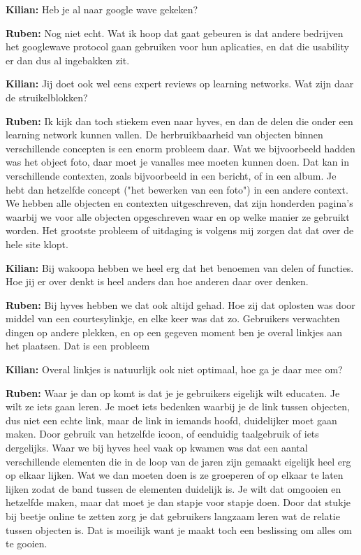 \textbf{Kilian:} Heb je al naar google wave gekeken?

\textbf{Ruben:} Nog niet echt. Wat ik hoop dat gaat gebeuren is dat andere bedrijven het googlewave protocol gaan gebruiken voor hun aplicaties, en dat die usability er dan dus al ingebakken zit.

\textbf{Kilian:} Jij doet ook wel eens expert reviews op learning networks. Wat zijn daar de struikelblokken?

\textbf{Ruben:} Ik kijk dan toch stiekem even naar hyves, en dan de delen die onder een learning network kunnen vallen. De herbruikbaarheid van objecten binnen verschillende concepten is een enorm probleem daar. Wat we bijvoorbeeld hadden was het object foto, daar moet je vanalles mee moeten kunnen doen. Dat kan in verschillende contexten, zoals bijvoorbeeld in een bericht, of in een album. Je hebt dan hetzelfde concept ("het bewerken van een foto") in een andere context. We hebben alle objecten en contexten uitgeschreven, dat zijn honderden pagina's waarbij we voor alle objecten opgeschreven waar en op welke manier ze gebruikt worden. Het grootste probleem of uitdaging is volgens mij zorgen dat dat over de hele site klopt.

\textbf{Kilian:} Bij wakoopa hebben we heel erg dat het benoemen van delen of functies. Hoe jij er over denkt is heel anders dan hoe anderen daar over denken.

\textbf{Ruben:} Bij hyves hebben we dat ook altijd gehad. Hoe zij dat oplosten was door middel van een courtesylinkje, en elke keer was dat zo. Gebruikers verwachten dingen op andere plekken, en op een gegeven moment ben je overal linkjes aan het plaatsen. Dat is een probleem

\textbf{Kilian:} Overal linkjes is natuurlijk ook niet optimaal, hoe ga je daar mee om?

\textbf{Ruben:} Waar je dan op komt is dat je je gebruikers eigelijk wilt educaten. Je wilt ze iets gaan leren. Je moet iets bedenken waarbij je de link tussen objecten, dus niet een echte link, maar de link in iemands hoofd, duidelijker moet gaan maken. Door gebruik van hetzelfde icoon, of eenduidig taalgebruik of iets dergelijks. Waar we bij hyves heel vaak op kwamen was dat een aantal verschillende elementen die in de loop van de jaren zijn gemaakt eigelijk heel erg op elkaar lijken. Wat we dan moeten doen is ze groeperen of op elkaar te laten lijken zodat de band tussen de elementen duidelijk is. Je wilt dat omgooien en hetzelfde maken, maar dat moet je dan stapje voor stapje doen. Door dat stukje bij beetje online te zetten zorg je dat gebruikers langzaam leren wat de relatie tussen objecten is. Dat is moeilijk want je maakt toch een beslissing om alles om te gooien.

